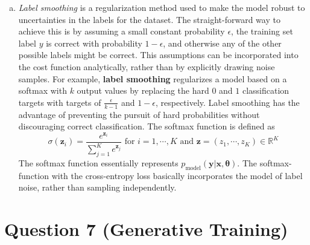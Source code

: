 \documentclass[fleqn]{article}
\begin{document}
\begin{enumerate}[a)]
	\item 
	\textit{Label smoothing} is a regularization method used to make the model robust to uncertainties in the labels for the dataset. 
	The straight-forward way to achieve this is by assuming a small constant probability $\epsilon$, the training set label $y$ is correct with probability $1-\epsilon$, and otherwise any of the other possible labels might be correct. This assumptions can be incorporated into the cost function analytically, rather than by explicitly  drawing noise samples. For example, \textbf{label smoothing} regularizes a model based on a softmax with $k$ output values by replacing the hard $0$ and $1$ classification targets with targets of $\frac{\epsilon}{k-1}$ and $1 - \epsilon$, respectively. Label smoothing has the advantage of preventing the pursuit of hard probabilities without discouraging correct classification.
	The softmax function is defined as 
	\begin{equation*}
		\sigma(\bm{z}_i) = \frac{e^{\bm{z}_i}}{\sum_{j=1}^K e^{\bm{z}_j}} \text{ for } i = 1, \cdots, K \text{ and } \bm{z} = (z_1, \cdots, z_K) \in \mathbb{R}^K
	\end{equation*}
	The softmax function essentially represents $p_{\text{model}}(\bm{y}|\bm{x}, \bm{\theta})$. The softmax-function with the cross-entropy loss basically incorporates the model of label noise, rather than sampling independently. 
\end{enumerate}


\section*{Question 7 (Generative Training)}
\end{document}
